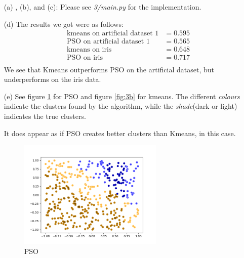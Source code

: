 \documentclass{scrartcl}
\begin{document}
\section{}
\begin{itemize}

  \item[(a)], (b), and (c):
    Please see \emph{3/main.py} for the implementation.

  \item[(d)]
    The results we got were as follows:
    \begin{align*}
      &\text{kmeans on artificial dataset 1} &= 0.595 \\
      &\text{PSO on artificial dataset 1} &= 0.565 \\
      &\text{kmeans on iris} &= 0.648 \\
      &\text{PSO on iris} &= 0.717 \\
    \end{align*}
    We see that Kmeans outperforms PSO on the artificial dataset, but
    underperforms on the iris data.

  \item[(e)]
    See figure \ref{fig:3a} for PSO and figure \ref{fig:3b} for kmeans.
    The different \emph{colours} indicate the clusters found by the algorithm,
    while the \emph{shade}(dark or light) indicates the true clusters.

    It does appear as if PSO creates better clusters than Kmeans, in this
    case.

    \begin{figure}
      \centering
      \includegraphics[width=0.65\textwidth]{3/pso.png}
      \caption{PSO}
      \label{fig:3a}
    \end{figure}


\end{itemize}
\end{document}
